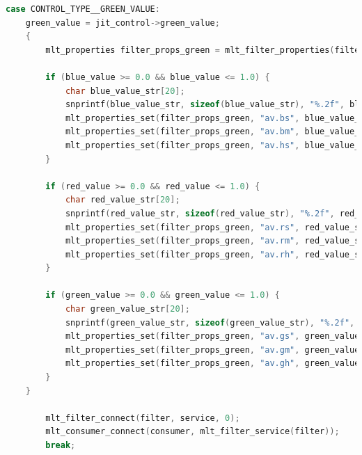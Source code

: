 \documentclass[../MasterThesis.tex]{subfiles}
\begin{document}
\begin{lstlisting}[language=c, numbers=none, columns=fullflexible]
	case CONTROL_TYPE__GREEN_VALUE:
	green_value = jit_control->green_value;
	{
		mlt_properties filter_props_green = mlt_filter_properties(filter);
				
		if (blue_value >= 0.0 && blue_value <= 1.0) {
			char blue_value_str[20]; 
			snprintf(blue_value_str, sizeof(blue_value_str), "%.2f", blue_value);
			mlt_properties_set(filter_props_green, "av.bs", blue_value_str);
			mlt_properties_set(filter_props_green, "av.bm", blue_value_str);
			mlt_properties_set(filter_props_green, "av.hs", blue_value_str);
		}
				
		if (red_value >= 0.0 && red_value <= 1.0) {
			char red_value_str[20]; 
			snprintf(red_value_str, sizeof(red_value_str), "%.2f", red_value);
			mlt_properties_set(filter_props_green, "av.rs", red_value_str);
			mlt_properties_set(filter_props_green, "av.rm", red_value_str);
			mlt_properties_set(filter_props_green, "av.rh", red_value_str);
		}
				
		if (green_value >= 0.0 && green_value <= 1.0) {
			char green_value_str[20]; 
			snprintf(green_value_str, sizeof(green_value_str), "%.2f", green_value);
			mlt_properties_set(filter_props_green, "av.gs", green_value_str);
			mlt_properties_set(filter_props_green, "av.gm", green_value_str);
			mlt_properties_set(filter_props_green, "av.gh", green_value_str);
		}
	}
			
		mlt_filter_connect(filter, service, 0);
		mlt_consumer_connect(consumer, mlt_filter_service(filter));
		break;

\end{lstlisting}
\end{document}
